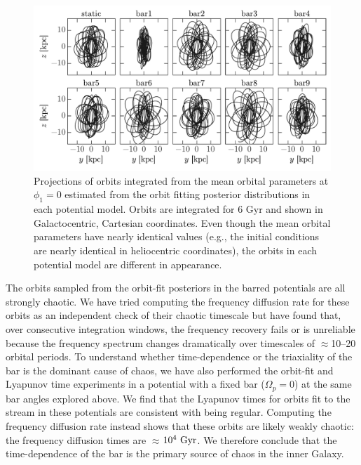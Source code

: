 \documentclass[letterpaper,12pt,preprint]{aastex}
\renewcommand{\changes}[1]{#1}
\begin{document}
\begin{figure}[!tbp]
\begin{center}
\includegraphics[width=\textwidth]{figures/orbit-yz}
\caption{  Projections of orbits integrated from the mean orbital parameters \changes{at $\phi_1 = 0$} estimated from the orbit fitting posterior distributions in each potential model. Orbits are integrated for 6 Gyr and shown in Galactocentric, Cartesian coordinates. Even though the mean orbital parameters have nearly identical values (e.g., the initial conditions are nearly identical in heliocentric coordinates), the orbits in each potential model are  different in appearance. }
\label{fig:orbits-yz}
\end{center}
\end{figure}

The orbits sampled from the orbit-fit posteriors in the barred potentials are all strongly chaotic. We have tried computing the frequency diffusion rate for these orbits as an independent check of their chaotic timescale but have found that, over consecutive integration windows, the frequency recovery fails or is unreliable because the frequency spectrum changes dramatically over timescales of $\approx$10--20 orbital periods. \changes{To understand whether time-dependence or the triaxiality of the bar is the dominant cause of chaos, we have also performed the orbit-fit and Lyapunov time experiments in a potential with a fixed bar ($\Omega_p = 0$) at the same bar angles explored above. We find that the Lyapunov times for orbits fit to the stream in these potentials are consistent with being regular. Computing the frequency diffusion rate instead shows that these orbits are likely weakly chaotic: the frequency diffusion times \citep{apw15-chaos} are $\approx$$10^4~{\rm Gyr}$. We therefore conclude that the time-dependence of the bar is the primary source of chaos in the inner Galaxy.}
\end{document}
